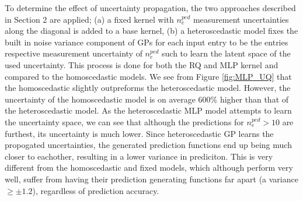 \documentclass[a4paper, twoside, final, 12pt]{article}
\begin{document}
{To determine the effect of uncertainty propagation, the two approaches described in Section 2 are applied; (a) a fixed kernel with $n_e^{ped}$ measurement uncertainties along the diagonal is added to a base kernel, (b) a heteroscedastic model fixes the built in noise variance component of GPs for each input entry to be the entries respective measurement uncertainty of $n_e^{ped}$ such to learn the latent space of the used uncertainty. This process is done for both the RQ and MLP kernel and compared to the homoscedastic models.
We see from Figure \ref{fig:MLP_UQ} that the homoscedastic slightly outpreforms the heteroscedastic model. However, the uncertainty of the homoscedastic model is on average 600\% higher than that of the heteroscedastic model. As the heteroscedastic MLP model attempts to learn the uncertainty space, we can see that although the predictions for $n_e^{ped} > 10$ are furthest, its uncertainty is much lower. Since heteroscedastic GP learns the propogated uncertainties, the generated prediction functions end up being much closer to eachother, resulting in a lower variance in prediciton. This is very different from the homoscedastic and fixed models, which although perform very well, suffer from having their prediction generating functions far apart (a variance $ \geq \pm 1.2$), regardless of prediction accuracy.

}
\end{document}
